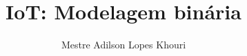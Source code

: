 \documentclass[compress, hyperref={pdfpagelayout=SinglePage}]{beamer}
\title[IoT]{IoT: Modelagem binária}
\author{Mestre Adilson Lopes Khouri}
\begin{document}
	\begin{frame}
		\titlepage
	\end{frame}
	
	
	
	
	
	
	
	
	
	
	
	
	
	
	
	

	
\end{document}
